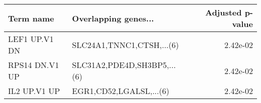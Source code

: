 \begin{tabular}{llr}
\toprule
     Term name &        Overlapping genes... &  Adjusted p-value \\
\midrule
 LEF1 UP.V1 DN &   SLC24A1,TNNC1,CTSH,...(6) &          2.42e-02 \\
RPS14 DN.V1 UP & SLC31A2,PDE4D,SH3BP5,...(6) &          2.42e-02 \\
  IL2 UP.V1 UP &     EGR1,CD52,LGALSL,...(6) &          2.42e-02 \\
\bottomrule
\end{tabular}
